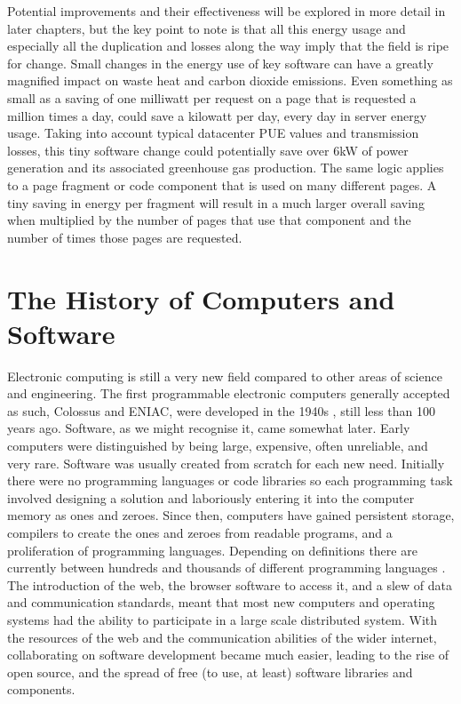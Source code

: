 Potential improvements and their effectiveness will be explored in more detail in later chapters, but the key point to note is that all this energy usage and especially all the duplication and losses along the way imply that the field is ripe for change. Small changes in the energy use of key software can have a greatly magnified impact on waste heat and carbon dioxide emissions. Even something as small as a saving of one milliwatt per request on a page that is requested a million times a day, could save a kilowatt per day, every day in server energy usage. Taking into account typical datacenter PUE values and transmission losses, this tiny software change could potentially save over 6kW of power generation and its associated greenhouse gas production. The same logic applies to a page fragment or code component that is used on many different pages. A tiny saving in energy per fragment will result in a much larger overall saving when multiplied by the number of pages that use that component and the number of times those pages are requested.

\section{The History of Computers and Software}
\label{section:context history}

Electronic computing is still a very new field compared to other areas of science and engineering. The first programmable electronic computers generally accepted as such, Colossus and ENIAC, were developed in the 1940s \citep{Campbell-Kelly2023}, still less than 100 years ago. Software, as we might recognise it, came somewhat later. Early computers were distinguished by being large, expensive, often unreliable, and very rare. Software was usually created from scratch for each new need. Initially there were no \gls{programming language}s or code libraries so each programming task involved designing a solution and laboriously entering it into the computer memory as ones and zeroes. Since then, computers have gained persistent storage, compilers to create the ones and zeroes from readable programs, and a proliferation of \gls{programming language}s. Depending on definitions there are currently between hundreds and thousands of different \gls{programming language}s \citep{Pigott2020}. The introduction of the web, the browser software to access it, and a slew of data and communication standards, meant that most new computers and operating systems had the ability to participate in a large scale distributed system. With the resources of the web and the communication abilities of the wider internet, collaborating on software development became much easier, leading to the rise of open source, and the spread of free (to use, at least) software libraries and components.

